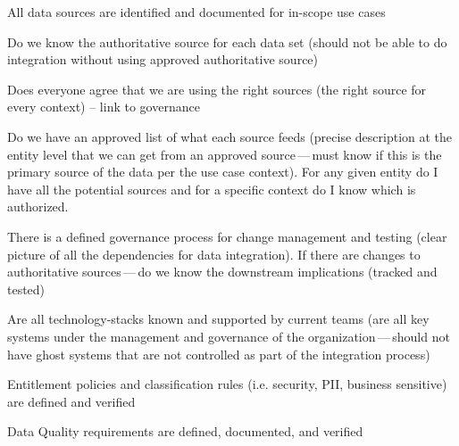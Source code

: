 \ekgmmCapabilitySectionLevelsOneFive

\ekgmmscoringlevelOne

\begin{scoring}

    \item All data sources are identified and documented for in-scope use cases
    \item Do we know the authoritative source for each data set (should not be able to do integration without
          using approved authoritative source)
    \item Does everyone agree that we are using the right sources (the right source for every context) --
          link to governance
    \item Do we have an approved list of what each source feeds (precise description at the entity level that
          we can get from an approved source\,---\,must know if this is the primary source of the data per the
          use case context).
          For any given entity do I have all the potential sources and for a specific context do I know which
          is authorized.
    \item There is a defined governance process for change management and testing (clear picture of all the
          dependencies for data integration).
          If there are changes to authoritative sources\,---\,do we know the downstream implications (tracked and tested)
    \item Are all \glspl{technology-stack} known and supported by current teams (are all key systems under the
          management and governance of the organization\,---\,should not have ghost systems that are not controlled
          as part of the integration process)
    \item Entitlement policies and classification rules (i.e. security, PII,
          business sensitive) are defined and verified
    \item Data Quality requirements are defined, documented, and verified

\end{scoring}

\ekgmmscoringlevelTwo

